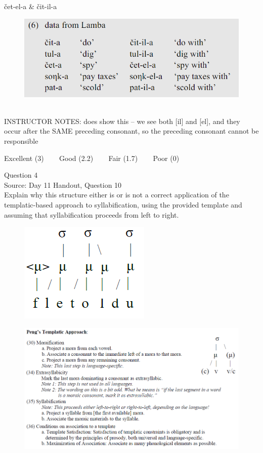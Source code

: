 \documentclass[12pt]{article}
\begin{document}
čet-el-a \& čit-il-a

\begin{figure}[H]
\includegraphics{../images/peng119_lamba.png}
\end{figure}

~\\
INSTRUCTOR NOTES: does show this -- we see both [il] and [el], and they occur after the SAME preceding consonant, so the preceding consonant cannot be responsible


\vfill
Excellent (3) ~~~ Good (2.2) ~~~ Fair (1.7) ~~~ Poor (0)
\newpage

{\large Question 4}\\

Source: Day 11 Handout, Question 10\\

Explain why this structure either is or is not a correct application of the templatic-based approach to syllabification, using the provided template and assuming that syllabification proceeds from left to right.\\

\begin{figure}[H]
\includegraphics{../images/pengtemplate_fletoldu_no.png}
\end{figure}
\begin{figure}[H]
\includegraphics{../images/peng_template_withdiagram.png}
\end{figure}
\end{document}
